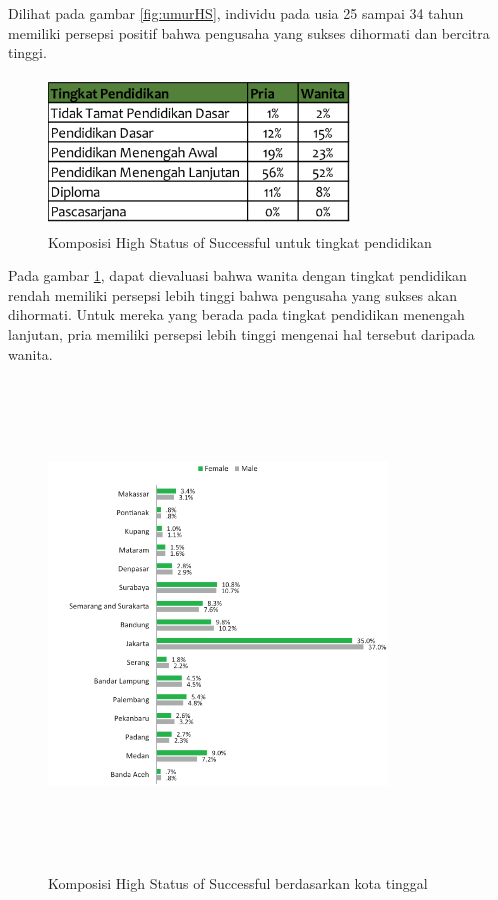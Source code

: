 \begin{enumerate}
Dilihat pada gambar \ref{fig:umurHS}, individu pada usia 25 sampai 34 tahun memiliki persepsi positif bahwa pengusaha yang sukses dihormati dan bercitra tinggi.

\begin{figure} [H]
	\centering  
	\includegraphics[width=8cm, height=4cm]{pendidikanHS2013} 
	\caption[Komposisi High Status of Successful untuk tingkat pendidikan]{Komposisi High Status of Successful untuk tingkat pendidikan} 
	\label{fig:pendidikanHS} 
\end{figure} 

Pada gambar \ref{fig:pendidikanHS}, dapat dievaluasi bahwa wanita dengan tingkat pendidikan rendah memiliki persepsi lebih tinggi bahwa pengusaha yang sukses akan dihormati. Untuk mereka yang berada pada tingkat pendidikan menengah lanjutan, pria memiliki persepsi lebih tinggi mengenai hal tersebut daripada wanita.

\begin{figure} [H]
	\centering  
	\includegraphics[width=9cm, height=13cm]{lokasiHS2013} 
	\caption[Komposisi High Status of Successful berdasarkan kota tinggal]{Komposisi High Status of Successful berdasarkan kota tinggal} 
	\label{fig:lokasiHS} 
\end{figure} 


\end{enumerate}
